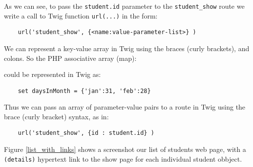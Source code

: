\documentclass[a4paperpaper,openright]{book}
\newenvironment{Shaded}{}{}
\newcommand{\DecValTok}[1]{\textcolor[rgb]{0.25,0.63,0.44}{#1}}
\newcommand{\KeywordTok}[1]{\textcolor[rgb]{0.00,0.44,0.13}{\textbf{#1}}}
\newcommand{\NormalTok}[1]{#1}
\newcommand{\OtherTok}[1]{\textcolor[rgb]{0.00,0.44,0.13}{#1}}
\newcommand{\StringTok}[1]{\textcolor[rgb]{0.25,0.44,0.63}{#1}}
\begin{document}
As we can see, to pass the \texttt{student.id} parameter to the
\texttt{student\_show} route we write a call to Twig function
\texttt{url(...)} in the form:

\begin{verbatim}
    url('student_show', {<name:value-parameter-list>} )
\end{verbatim}

We can represent a key-value array in Twig using the braces (curly
brackets), and colons. So the PHP associative array (map):

\begin{Shaded}
\end{Shaded}

could be represented in Twig as:

\begin{verbatim}
    set daysInMonth = {'jan':31, 'feb':28}
\end{verbatim}

Thus we can pass an array of parameter-value pairs to a route in Twig
using the brace (curly bracket) syntax, as in:

\begin{verbatim}
    url('student_show', {id : student.id} )
\end{verbatim}

Figure \ref{list_with_links} shows a screenshot our list of students web
page, with a \texttt{(details)} hypertext link to the show page for each
individual student obbject.
\end{document}
